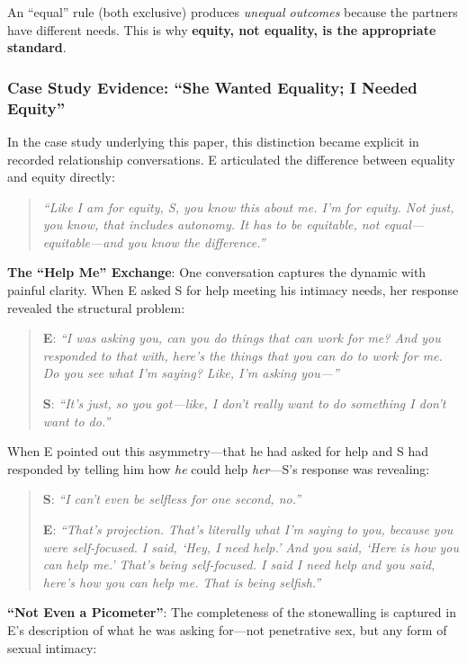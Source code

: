 \documentclass[12pt, letterpaper]{article}
\begin{document}
An ``equal'' rule (both exclusive) produces \textit{unequal outcomes} because the partners have different needs. This is why \textbf{equity, not equality, is the appropriate standard}.

\subsubsection{Case Study Evidence: ``She Wanted Equality; I Needed Equity''}

In the case study underlying this paper, this distinction became explicit in recorded relationship conversations. E articulated the difference between equality and equity directly:

\begin{quote}
\textit{``Like I am for equity, S, you know this about me. I'm for equity. Not just, you know, that includes autonomy. It has to be equitable, not equal---equitable---and you know the difference.''}
\end{quote}

\textbf{The ``Help Me'' Exchange}: One conversation captures the dynamic with painful clarity. When E asked S for help meeting his intimacy needs, her response revealed the structural problem:

\begin{quote}
\textbf{E}: \textit{``I was asking you, can you do things that can work for me? And you responded to that with, here's the things that you can do to work for me. Do you see what I'm saying? Like, I'm asking you---''}

\textbf{S}: \textit{``It's just, so you got---like, I don't really want to do something I don't want to do.''}
\end{quote}

When E pointed out this asymmetry---that he had asked for help and S had responded by telling him how \textit{he} could help \textit{her}---S's response was revealing:

\begin{quote}
\textbf{S}: \textit{``I can't even be selfless for one second, no.''}

\textbf{E}: \textit{``That's projection. That's literally what I'm saying to you, because you were self-focused. I said, `Hey, I need help.' And you said, `Here is how you can help me.' That's being self-focused. I said I need help and you said, here's how you can help me. That is being selfish.''}
\end{quote}

\textbf{``Not Even a Picometer''}: The completeness of the stonewalling is captured in E's description of what he was asking for---not penetrative sex, but any form of sexual intimacy:
\end{document}
